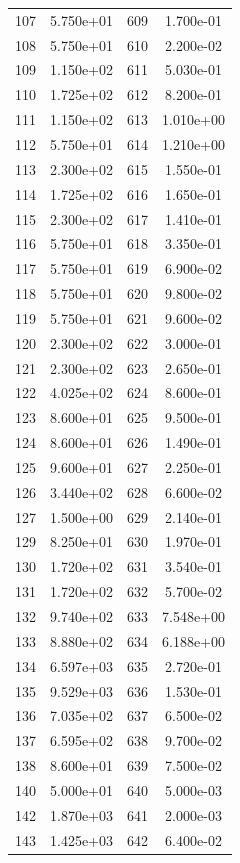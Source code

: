 \documentclass[12pt]{article}
\begin{document}
\begin{longtable}{@{}cccc@{}}
107 & 5.750e+01 & 609 & 1.700e-01 \\
108 & 5.750e+01 & 610 & 2.200e-02 \\
109 & 1.150e+02 & 611 & 5.030e-01 \\
110 & 1.725e+02 & 612 & 8.200e-01 \\
111 & 1.150e+02 & 613 & 1.010e+00 \\
112 & 5.750e+01 & 614 & 1.210e+00 \\
113 & 2.300e+02 & 615 & 1.550e-01 \\
114 & 1.725e+02 & 616 & 1.650e-01 \\
115 & 2.300e+02 & 617 & 1.410e-01 \\
116 & 5.750e+01 & 618 & 3.350e-01 \\
117 & 5.750e+01 & 619 & 6.900e-02 \\
118 & 5.750e+01 & 620 & 9.800e-02 \\
119 & 5.750e+01 & 621 & 9.600e-02 \\
120 & 2.300e+02 & 622 & 3.000e-01 \\
121 & 2.300e+02 & 623 & 2.650e-01 \\
122 & 4.025e+02 & 624 & 8.600e-01 \\
123 & 8.600e+01 & 625 & 9.500e-01 \\
124 & 8.600e+01 & 626 & 1.490e-01 \\
125 & 9.600e+01 & 627 & 2.250e-01 \\
126 & 3.440e+02 & 628 & 6.600e-02 \\
127 & 1.500e+00 & 629 & 2.140e-01 \\
129 & 8.250e+01 & 630 & 1.970e-01 \\
130 & 1.720e+02 & 631 & 3.540e-01 \\
131 & 1.720e+02 & 632 & 5.700e-02 \\
132 & 9.740e+02 & 633 & 7.548e+00 \\
133 & 8.880e+02 & 634 & 6.188e+00 \\
134 & 6.597e+03 & 635 & 2.720e-01 \\
135 & 9.529e+03 & 636 & 1.530e-01 \\
136 & 7.035e+02 & 637 & 6.500e-02 \\
137 & 6.595e+02 & 638 & 9.700e-02 \\
138 & 8.600e+01 & 639 & 7.500e-02 \\
140 & 5.000e+01 & 640 & 5.000e-03 \\
142 & 1.870e+03 & 641 & 2.000e-03 \\
143 & 1.425e+03 & 642 & 6.400e-02 \\

\end{longtable}
\end{document}
